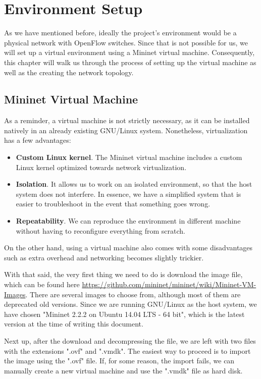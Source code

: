 \chapter{Environment Setup} \label{chapter:environment}
As we have mentioned before, ideally the project's environment would be a physical network with OpenFlow switches. Since that is not possible for us, we will set up a virtual environment using a Mininet virtual machine. Consequently, this chapter will walk us through the process of setting up the virtual machine as well as the creating the network topology.

\section{Mininet Virtual Machine}
As a reminder, a virtual machine is not strictly necessary, as it can be installed natively in an already existing GNU/Linux system. Nonetheless, virtualization has a few advantages:
\begin{itemize}
    \item \textbf{Custom Linux kernel}. The Mininet virtual machine includes a custom Linux kernel optimized towards network virtualization.
    \item \textbf{Isolation}. It allows us to work on an isolated environment, so that the host system does not interfere. In essence, we have a simplified system that is easier to troubleshoot in the event that something goes wrong.
    \item \textbf{Repeatability}. We can reproduce the environment in different machine without having to reconfigure everything from scratch.
\end{itemize}

On the other hand, using a virtual machine also comes with some disadvantages such as extra overhead and networking becomes slightly trickier.

With that said, the very first thing we need to do is download the image file, which can be found here \url{https://github.com/mininet/mininet/wiki/Mininet-VM-Images}. There are several images to choose from, although most of them are deprecated old versions. Since we are running GNU/Linux as the host system, we have chosen "Mininet 2.2.2 on Ubuntu 14.04 LTS - 64 bit", which is the latest version at the time of writing this document.

Next up, after the download and decompressing the file, we are left with two files with the extensions ".ovf" and ".vmdk". The easiest way to proceed is to import the image using the ".ovf" file. If, for some reason, the import fails, we can manually create a new virtual machine and use the ".vmdk" file as hard disk.

